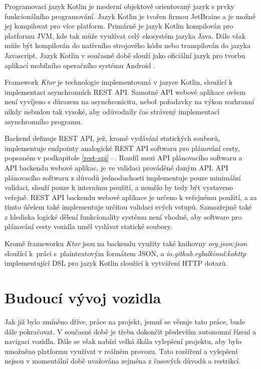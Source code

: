 \documentclass[czech, bachelor]{diploma}
\newcommand{\peteref}[1]{\ref{#1}\,--\,\nameref{#1}}
\begin{document}
Programovací jazyk Kotlin je moderní objektově orientovaný jazyk s prvky funkcionálního programování. Jazyk Kotlin je tvořen
firmou JetBrains a je možné jej kompilovat pro více platform. Primárně je jazyk Kotlin kompilován pro platformu JVM, kde tak může
využívat celý ekosystém jazyka Java. Dále však může být kompilován do nativního strojového kódu nebo transpilován do jazyka
Javascript. Jazyk Kotlin v současné době slouží jako oficiální jazyk pro tvorbu aplikací mobilního operačního systému Android
\cite{kotlin-android-source}.

Framework \emph{Ktor} je technologie implementovaná v jazyce Kotlin, sloužící k implementaci asynchronních REST API. Samotné API
webové aplikace ovšem není vyvíjeno s důrazem na asynchronicitu, neboť požadavky na výkon rozhranní nikdy nebudou tak vysoké, aby
odůvodnily čas strávený implementací asynchronního programu.

Backend definuje REST API, jež, kromě vydávání statických souborů, implementuje endpointy analogické REST API softwaru
pro plánování cesty, popsaném v podkapitole \peteref{rest-api}. Rozdíl mezi API plánovacího softwaru a API backendu webové
aplikac, je ve validaci prováděné daným API. API plánovacího softwaru z důvodů jednoduchosti implementuje pouze minimální
validaci, slouží pouze k internímu použití, a nemělo by tedy být vystaveno veřejně. REST API backendu webové aplikace je určeno
k veřejnému použití, a za tímto účelem také implementuje určitou validaci svých vstupů. Samozřejmě také z hlediska logické dělení
funkcionality systému není vhodné, aby software pro plánování cesty vozidla uměl vydávat statické soubory.

Kromě frameworku \emph{Ktor} jsou na backendu využity také knihovny \emph{org.json:json} sloužící k~práci s~plaintextovým formátem
JSON, a \emph{io.github.rybalkinsd:kohttp} implementující DSL pro jazyk Kotlin sloužící k vytváření HTTP dotazů.

\chapter{Budoucí vývoj vozidla}

Jak již bylo zmíněno dříve, práce na projekt, jemuž se věnuje tato práce, bude dále pokračovat. V současné době je třeba dokončit
především autonomní řízení a navigaci vozidla. Dále se však nabízí velká škála vylepšení projektu, aby bylo umožněno platformu
využívat v reálném provozu. Tato rozšíření a vylepšení nejsou v momentální době uvažována zejména z časových důvodů a restrikcí.
\end{document}
